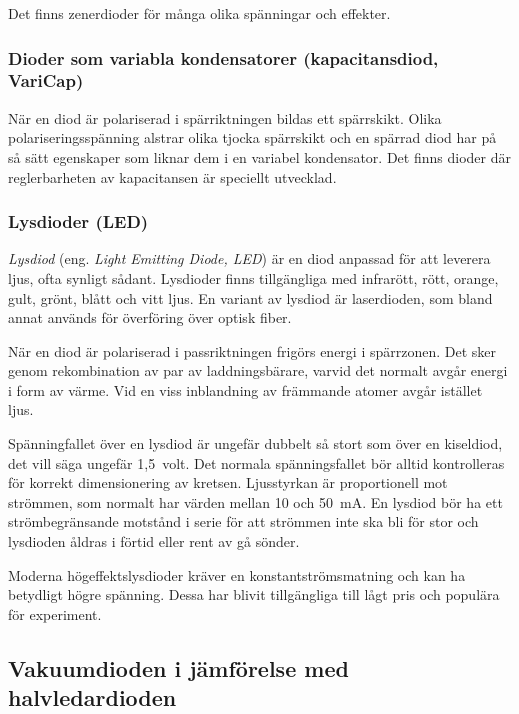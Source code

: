 Det finns zenerdioder för många olika spänningar och effekter.

\subsubsection{Dioder som variabla kondensatorer (kapacitansdiod, VariCap)}
\label{varicap}

När en diod är polariserad i spärriktningen bildas ett spärrskikt.
Olika polariseringsspänning alstrar olika tjocka spärrskikt och en spärrad diod
har på så sätt egenskaper som liknar dem i en variabel kondensator.
Det finns dioder där reglerbarheten av kapacitansen är speciellt utvecklad.

\newpage
\subsubsection{Lysdioder (LED)}
\label{diod_led}

\emph{Lysdiod} (eng. \emph{Light Emitting Diode, LED}) är en diod anpassad för
att leverera ljus, ofta synligt sådant.
Lysdioder finns tillgängliga med infrarött, rött, orange, gult, grönt,
blått och vitt ljus.
En variant av lysdiod är laserdioden, som bland annat används för överföring
över optisk fiber.

När en diod är polariserad i passriktningen frigörs energi i spärrzonen.
Det sker genom rekombination av par av laddningsbärare, varvid det normalt avgår
energi i form av värme.
Vid en viss inblandning av främmande atomer avgår istället ljus.

Spänningfallet över en lysdiod är ungefär dubbelt så stort som över en
kiseldiod, det vill säga ungefär 1,5~volt.
Det normala spänningsfallet bör alltid kontrolleras för korrekt dimensionering
av kretsen.
Ljusstyrkan är proportionell mot strömmen, som normalt har värden mellan 10 och
\qty{50}{\milli\ampere}.
En lysdiod bör ha ett strömbegränsande motstånd i serie för att strömmen
inte ska bli för stor och lysdioden åldras i förtid eller rent av gå sönder.

Moderna högeffektslysdioder kräver en konstant\-strömsmatning och kan ha betydligt
högre spänning.
Dessa har blivit tillgängliga till lågt pris och populära för experiment.

\subsection{Vakuumdioden i jämförelse med halvledardioden}

